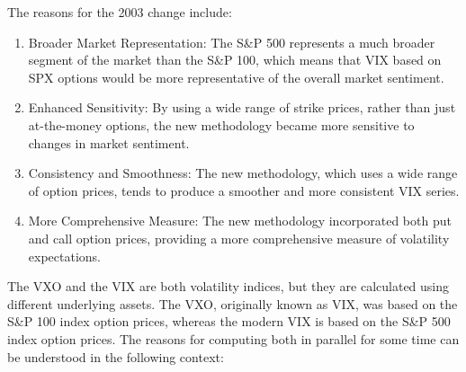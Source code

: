 \documentclass[12pt, a4paper]{article}
\theoremstyle{definition}
\begin{document}
The reasons for the 2003 change include:
\begin{enumerate}[label = \roman*.]
\item Broader Market Representation: The S\&P 500 represents a much broader segment of the market than the S\&P 100, which means that VIX based on SPX options would be more representative of the overall market sentiment.

\item Enhanced Sensitivity: By using a wide range of strike prices, rather than just at-the-money options, the new methodology became more sensitive to changes in market sentiment.

\item Consistency and Smoothness: The new methodology, which uses a wide range of option prices, tends to produce a smoother and more consistent VIX series.

\item More Comprehensive Measure: The new methodology incorporated both put and call option prices, providing a more comprehensive measure of volatility expectations.

\end{enumerate}

\quad The VXO and the VIX are both volatility indices, but they are calculated using different underlying assets. The VXO, originally known as VIX, was based on the S\&P 100 index option prices, whereas the modern VIX is based on the S\&P 500 index option prices. The reasons for computing both in parallel for some time can be understood in the following context:
\end{document}
